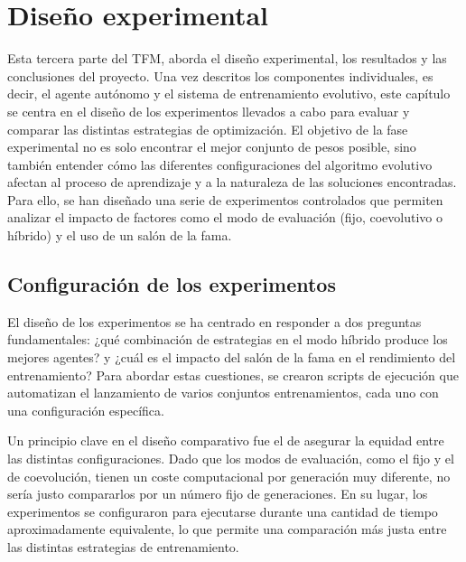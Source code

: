 \chapter{Diseño experimental} \label{chap:experimentacion}

Esta tercera parte del TFM, aborda el diseño experimental, los resultados y las conclusiones del proyecto. Una vez descritos los componentes individuales, es decir, el agente autónomo y el sistema de entrenamiento evolutivo, este capítulo se centra en el diseño de los experimentos llevados a cabo para evaluar y comparar las distintas estrategias de optimización. El objetivo de la fase experimental no es solo encontrar el mejor conjunto de pesos posible, sino también entender cómo las diferentes configuraciones del algoritmo evolutivo afectan al proceso de aprendizaje y a la naturaleza de las soluciones encontradas. Para ello, se han diseñado una serie de experimentos controlados que permiten analizar el impacto de factores como el modo de evaluación (fijo, coevolutivo o híbrido) y el uso de un salón de la fama.

\section{Configuración de los experimentos} \label{sec:configuracion_experimentos}

El diseño de los experimentos se ha centrado en responder a dos preguntas fundamentales: ¿qué combinación de estrategias en el modo híbrido produce los mejores agentes? y ¿cuál es el impacto del salón de la fama en el rendimiento del entrenamiento? Para abordar estas cuestiones, se crearon scripts de ejecución que automatizan el lanzamiento de varios conjuntos entrenamientos, cada uno con una configuración específica.

Un principio clave en el diseño comparativo fue el de asegurar la equidad entre las distintas configuraciones. Dado que los modos de evaluación, como el fijo y el de coevolución, tienen un coste computacional por generación muy diferente, no sería justo compararlos por un número fijo de generaciones. En su lugar, los experimentos se configuraron para ejecutarse durante una cantidad de tiempo aproximadamente equivalente, lo que permite una comparación más justa entre las distintas estrategias de entrenamiento.

